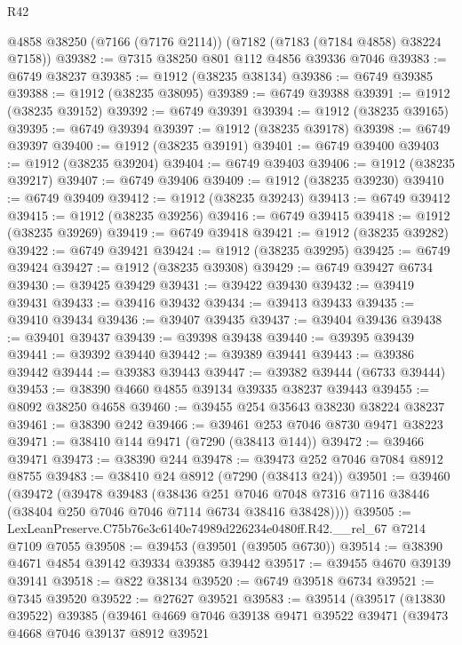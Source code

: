 \begin{lexlean}{R42}
\begin{coremodule}
{    @4858
    @38250
    (@7166 (@7176 @2114))
    (@7182 (@7183 (@7184 @4858) @38224 @7158))
@39382 := @7315 @38250 @801 @112 @4856 @39336 @7046
@39383 := @6749 @38237
@39385 := @1912 (@38235 @38134)
@39386 := @6749 @39385
@39388 := @1912 (@38235 @38095)
@39389 := @6749 @39388
@39391 := @1912 (@38235 @39152)
@39392 := @6749 @39391
@39394 := @1912 (@38235 @39165)
@39395 := @6749 @39394
@39397 := @1912 (@38235 @39178)
@39398 := @6749 @39397
@39400 := @1912 (@38235 @39191)
@39401 := @6749 @39400
@39403 := @1912 (@38235 @39204)
@39404 := @6749 @39403
@39406 := @1912 (@38235 @39217)
@39407 := @6749 @39406
@39409 := @1912 (@38235 @39230)
@39410 := @6749 @39409
@39412 := @1912 (@38235 @39243)
@39413 := @6749 @39412
@39415 := @1912 (@38235 @39256)
@39416 := @6749 @39415
@39418 := @1912 (@38235 @39269)
@39419 := @6749 @39418
@39421 := @1912 (@38235 @39282)
@39422 := @6749 @39421
@39424 := @1912 (@38235 @39295)
@39425 := @6749 @39424
@39427 := @1912 (@38235 @39308)
@39429 := @6749 @39427 @6734
@39430 := @39425 @39429
@39431 := @39422 @39430
@39432 := @39419 @39431
@39433 := @39416 @39432
@39434 := @39413 @39433
@39435 := @39410 @39434
@39436 := @39407 @39435
@39437 := @39404 @39436
@39438 := @39401 @39437
@39439 := @39398 @39438
@39440 := @39395 @39439
@39441 := @39392 @39440
@39442 := @39389 @39441
@39443 := @39386 @39442
@39444 := @39383 @39443
@39447 := @39382 @39444 (@6733 @39444)
@39453 := @38390 @4660 @4855 @39134 @39335 @38237 @39443
@39455 := @8092 @38250 @4658
@39460 := @39455 @254 @35643 @38230 @38224 @38237
@39461 := @38390 @242
@39466 := @39461 @253 @7046 @8730 @9471 @38223
@39471 := @38410 @144 @9471 (@7290 (@38413 @144))
@39472 := @39466 @39471
@39473 := @38390 @244
@39478 := @39473 @252 @7046 @7084 @8912 @8755
@39483 := @38410 @24 @8912 (@7290 (@38413 @24))
@39501 := @39460
    (@39472
      (@39478
        @39483
        (@38436
          @251
          @7046
          @7048
          @7316
          @7116
          @38446
          (@38404 @250 @7046 @7046 @7114 @6734 @38416 @38428))))
@39505 := LexLeanPreserve.C75b76e3c6140e74989d226234e0480ff.R42.__rel_67 @7214 @7109 @7055
@39508 := @39453 (@39501 (@39505 @6730))
@39514 := @38390 @4671 @4854 @39142 @39334 @39385 @39442
@39517 := @39455 @4670 @39139 @39141
@39518 := @822 @38134
@39520 := @6749 @39518 @6734
@39521 := @7345 @39520
@39522 := @27627 @39521
@39583 := @39514
    (@39517
      (@13830 @39522)
      @39385
      (@39461
        @4669
        @7046
        @39138
        @9471
        @39522
        @39471
        (@39473
          @4668
          @7046
          @39137
          @8912
          @39521
}
\end{coremodule}
\end{lexlean}
